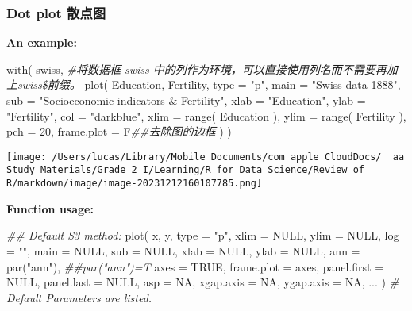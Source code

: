 \documentclass[
]{article}
\let\oldincludegraphics\includegraphics
\renewcommand{\includegraphics}[2][]{\begin{center}\oldincludegraphics[#1]{#2}\end{center}}
\newenvironment{Shaded}{}{}
\newcommand{\AttributeTok}[1]{\textcolor[rgb]{0.49,0.56,0.16}{#1}}
\newcommand{\CommentTok}[1]{\textcolor[rgb]{0.38,0.63,0.69}{\textit{#1}}}
\newcommand{\ConstantTok}[1]{\textcolor[rgb]{0.53,0.00,0.00}{#1}}
\newcommand{\DecValTok}[1]{\textcolor[rgb]{0.25,0.63,0.44}{#1}}
\newcommand{\DocumentationTok}[1]{\textcolor[rgb]{0.73,0.13,0.13}{\textit{#1}}}
\newcommand{\FunctionTok}[1]{\textcolor[rgb]{0.02,0.16,0.49}{#1}}
\newcommand{\NormalTok}[1]{#1}
\newcommand{\StringTok}[1]{\textcolor[rgb]{0.25,0.44,0.63}{#1}}
\begin{document}
\hypertarget{dot-plot-ux6563ux70b9ux56fe}{%
\subsubsection{Dot plot 散点图}\label{dot-plot-ux6563ux70b9ux56fe}}

\textbf{An example:}

\begin{Shaded}
\begin{Highlighting}[]
\FunctionTok{with}\NormalTok{( }
\NormalTok{  swiss,}
  \CommentTok{\#将数据框 swiss 中的列作为环境，可以直接使用列名而不需要再加上swiss\$前缀。 }
  \FunctionTok{plot}\NormalTok{(}
\NormalTok{    Education, }
\NormalTok{    Fertility,}
    \AttributeTok{type =} \StringTok{"p"}\NormalTok{, }
    \AttributeTok{main =} \StringTok{"Swiss data 1888"}\NormalTok{, }
    \AttributeTok{sub =} \StringTok{"Socioeconomic indicators \& Fertility"}\NormalTok{, }
    \AttributeTok{xlab =} \StringTok{"Education"}\NormalTok{, }
    \AttributeTok{ylab =} \StringTok{"Fertility"}\NormalTok{, }
    \AttributeTok{col =} \StringTok{"darkblue"}\NormalTok{, }
    \AttributeTok{xlim =} \FunctionTok{range}\NormalTok{( Education ), }
    \AttributeTok{ylim =} \FunctionTok{range}\NormalTok{( Fertility ), }
    \AttributeTok{pch =} \DecValTok{20}\NormalTok{, }
    \AttributeTok{frame.plot =}\NormalTok{ F}\DocumentationTok{\#\#去除图的边框}
\NormalTok{  ) }
\NormalTok{)}
\end{Highlighting}
\end{Shaded}

\texttt{[image: /Users/lucas/Library/Mobile Documents/com~apple~CloudDocs/~~aa Study Materials/Grade 2 I/Learning/R for Data Science/Review of R/markdown/image/image-20231212160107785.png]}

\textbf{Function usage:}

\begin{Shaded}
\begin{Highlighting}[]
\DocumentationTok{\#\# Default S3 method:}
\FunctionTok{plot}\NormalTok{(}
\NormalTok{  x, }
\NormalTok{  y, }
  \AttributeTok{type =} \StringTok{"p"}\NormalTok{, }
  \AttributeTok{xlim =} \ConstantTok{NULL}\NormalTok{, }\AttributeTok{ylim =} \ConstantTok{NULL}\NormalTok{,}
  \AttributeTok{log =} \StringTok{""}\NormalTok{, }
  \AttributeTok{main =} \ConstantTok{NULL}\NormalTok{, }\AttributeTok{sub =} \ConstantTok{NULL}\NormalTok{, }
  \AttributeTok{xlab =} \ConstantTok{NULL}\NormalTok{, }\AttributeTok{ylab =} \ConstantTok{NULL}\NormalTok{,}
  \AttributeTok{ann =} \FunctionTok{par}\NormalTok{(}\StringTok{"ann"}\NormalTok{), }\DocumentationTok{\#\#par("ann")=T}
  \AttributeTok{axes =} \ConstantTok{TRUE}\NormalTok{, }\AttributeTok{frame.plot =}\NormalTok{ axes,}
  \AttributeTok{panel.first =} \ConstantTok{NULL}\NormalTok{, }\AttributeTok{panel.last =} \ConstantTok{NULL}\NormalTok{, }\AttributeTok{asp =} \ConstantTok{NA}\NormalTok{,}
  \AttributeTok{xgap.axis =} \ConstantTok{NA}\NormalTok{, }\AttributeTok{ygap.axis =} \ConstantTok{NA}\NormalTok{,}
\NormalTok{  ...}
\NormalTok{)}
\CommentTok{\# Default Parameters are listed.}
\end{Highlighting}
\end{Shaded}
\end{document}
